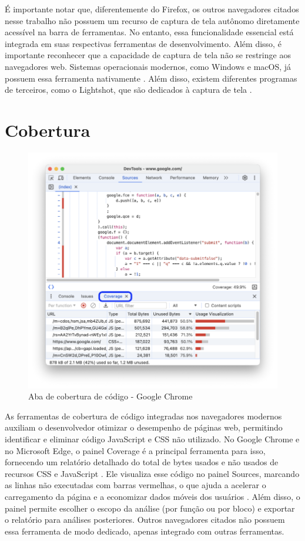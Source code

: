 É importante notar que, diferentemente do Firefox, os outros navegadores citados nesse trabalho não possuem um recurso de captura de tela autônomo diretamente acessível na barra de ferramentas. No entanto, essa funcionalidade essencial está integrada em suas respectivas ferramentas de desenvolvimento. Além disso, é importante reconhecer que a capacidade de captura de tela não se restringe aos navegadores web. Sistemas operacionais modernos, como Windows e macOS, já possuem essa ferramenta nativamente \cite{print-mac, print-windows}. Além disso, existem diferentes programas de terceiros, como o Lightshot, que são dedicados à captura de tela \cite{lightshot}. 

\section{Cobertura}
\begin{figure}[h!]
    \centering
    \includegraphics[width=0.7\linewidth]{assets/tools/chrome-coverage.png}
    \caption{Aba de cobertura de código - Google Chrome }
    \label{fig:enter-label}
\end{figure}
As ferramentas de cobertura de código integradas nos navegadores modernos auxiliam o desenvolvedor otimizar o desempenho de páginas web, permitindo identificar e eliminar código JavaScript e CSS não utilizado. No Google Chrome e no Microsoft Edge, o painel Coverage é a principal ferramenta para isso, fornecendo um relatório detalhado do total de bytes usados e não usados de recursos CSS e JavaScript \cite{chrome}. Ele visualiza esse código no painel Sources, marcando as linhas não executadas com barras vermelhas, o que ajuda a acelerar o carregamento da página e a economizar dados móveis dos usuários \cite{chrome}. Além disso, o painel permite escolher o escopo da análise (por função ou por bloco) e exportar o relatório para análises posteriores. Outros navegadores citados não possuem essa ferramenta de modo dedicado, apenas integrado com outras ferramentas.

